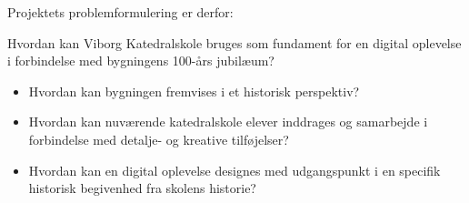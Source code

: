 Projektets problemformulering er derfor:

Hvordan kan Viborg Katedralskole bruges som fundament for en digital oplevelse i forbindelse med bygningens 100-års jubilæum?

\begin{itemize}
    \item Hvordan kan bygningen fremvises i et historisk perspektiv?
    \item Hvordan kan nuværende katedralskole elever inddrages og samarbejde i forbindelse med detalje- og kreative tilføjelser?
    \item Hvordan kan en digital oplevelse designes med udgangspunkt i en specifik historisk begivenhed fra skolens historie?
\end{itemize}
